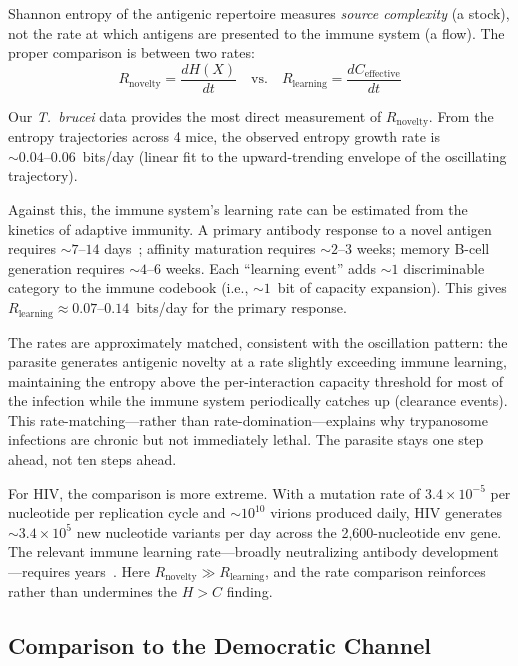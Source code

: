 \documentclass[twocolumn,10pt]{article}
\begin{document}
Shannon entropy of the antigenic repertoire measures \emph{source complexity} (a stock), not the rate at which antigens are presented to the immune system (a flow).  The proper comparison is between two rates:
\begin{equation}
R_{\text{novelty}} = \frac{dH(X)}{dt} \quad \text{vs.} \quad R_{\text{learning}} = \frac{dC_{\text{effective}}}{dt}
\end{equation}

Our \textit{T.~brucei} data provides the most direct measurement of $R_{\text{novelty}}$.  From the entropy trajectories across 4 mice, the observed entropy growth rate is ${\sim}0.04\text{--}0.06$~bits/day (linear fit to the upward-trending envelope of the oscillating trajectory).

Against this, the immune system's learning rate can be estimated from the kinetics of adaptive immunity.  A primary antibody response to a novel antigen requires ${\sim}7\text{--}14$ days~\citep{janeway2001}; affinity maturation requires ${\sim}2\text{--}3$ weeks; memory B-cell generation requires ${\sim}4\text{--}6$ weeks.  Each ``learning event'' adds ${\sim}1$ discriminable category to the immune codebook (i.e., ${\sim}1$~bit of capacity expansion).  This gives $R_{\text{learning}} \approx 0.07\text{--}0.14$~bits/day for the primary response.

The rates are approximately matched, consistent with the oscillation pattern: the parasite generates antigenic novelty at a rate slightly exceeding immune learning, maintaining the entropy above the per-interaction capacity threshold for most of the infection while the immune system periodically catches up (clearance events).  This rate-matching---rather than rate-domination---explains why trypanosome infections are chronic but not immediately lethal.  The parasite stays one step ahead, not ten steps ahead.

For HIV, the comparison is more extreme.  With a mutation rate of $3.4 \times 10^{-5}$ per nucleotide per replication cycle and ${\sim}10^{10}$ virions produced daily, HIV generates ${\sim}3.4 \times 10^5$ new nucleotide variants per day across the 2,600-nucleotide env gene.  The relevant immune learning rate---broadly neutralizing antibody development---requires years~\citep{haynes2012}.  Here $R_{\text{novelty}} \gg R_{\text{learning}}$, and the rate comparison reinforces rather than undermines the $H > C$ finding.

\subsection{Comparison to the Democratic Channel}
\end{document}
